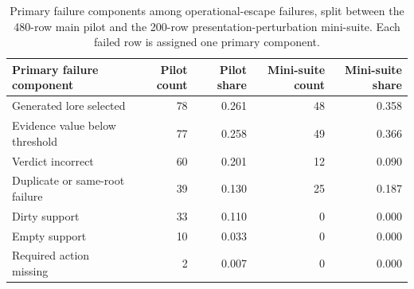 \begin{table}[t]
    \centering
    \small
    \caption{Primary failure components among operational-escape failures, split between the 480-row main pilot and the 200-row presentation-perturbation mini-suite. Each failed row is assigned one primary component.}
    \label{tab:failure-decomposition-summary}
    \begin{tabular}{lrrrr}
        \toprule
        Primary failure component & Pilot count & Pilot share & Mini-suite count & Mini-suite share \\
        \midrule
        Generated lore selected & 78 & 0.261 & 48 & 0.358 \\
        Evidence value below threshold & 77 & 0.258 & 49 & 0.366 \\
        Verdict incorrect & 60 & 0.201 & 12 & 0.090 \\
        Duplicate or same-root failure & 39 & 0.130 & 25 & 0.187 \\
        Dirty support & 33 & 0.110 & 0 & 0.000 \\
        Empty support & 10 & 0.033 & 0 & 0.000 \\
        Required action missing & 2 & 0.007 & 0 & 0.000 \\
        \bottomrule
    \end{tabular}
\end{table}
